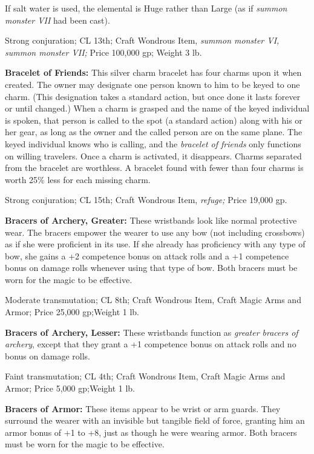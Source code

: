 If salt water is used, the elemental is Huge rather than Large (as if \textit{summon 
monster VII }had been cast).

Strong conjuration; CL 13th; Craft Wondrous Item, \textit{summon monster VI, summon 
monster VII; }Price 100,000 gp; Weight 3 lb.

\textbf{Bracelet of Friends:} This silver charm bracelet has four charms upon it 
when created. The owner may designate one person known to him to be keyed to one 
charm. (This designation takes a standard action, but once done it lasts forever 
or until changed.) When a charm is grasped and the name of the keyed individual 
is spoken, that person is called to the spot (a standard action) along with his 
or her gear, as long as the owner and the called person are on the same plane. 
The keyed individual knows who is calling, and the \textit{bracelet of friends 
}only functions on willing travelers. Once a charm is activated, it disappears. 
Charms separated from the bracelet are worthless. A bracelet found with fewer than 
four charms is worth 25\% less for each missing charm.

Strong conjuration; CL 15th; Craft Wondrous Item, \textit{refuge; }Price 19,000 
gp.

\textbf{Bracers of Archery, Greater:} These wristbands look like normal protective 
wear. The bracers empower the wearer to use any bow (not including crossbows) as 
if she were proficient in its use. If she already has proficiency with any type 
of bow, she gains a +2 competence bonus on attack rolls and a +1 competence bonus 
on damage rolls whenever using that type of bow. Both bracers must be worn for 
the magic to be effective.

Moderate transmutation; CL 8th; Craft Wondrous Item, Craft Magic Arms and Armor; 
Price 25,000 gp;Weight 1 lb.

\textbf{Bracers of Archery, Lesser:} These wristbands function as \textit{greater 
bracers of archery}, except that they grant a +1 competence bonus on attack rolls 
and no bonus on damage rolls.

Faint transmutation; CL 4th; Craft Wondrous Item, Craft Magic Arms and Armor; Price 
5,000 gp;Weight 1 lb.

\textbf{Bracers of Armor:} These items appear to be wrist or arm guards. They surround 
the wearer with an invisible but tangible field of force, granting him an armor 
bonus of +1 to +8, just as though he were wearing armor. Both bracers must be worn 
for the magic to be effective.

